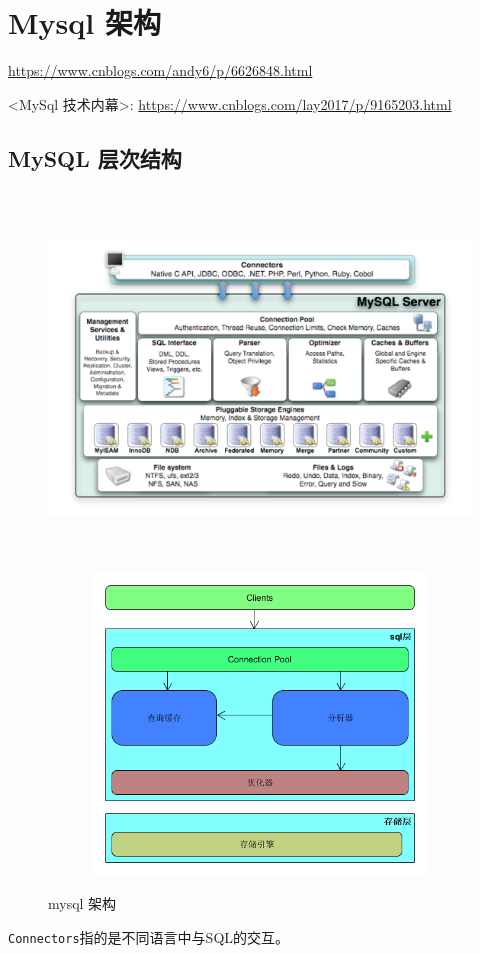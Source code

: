 \documentclass[UTF8,a4paper,12pt]{ctexbook}
\begin{document}
	\newpage	
	\section{Mysql 架构}
		\url{https://www.cnblogs.com/andy6/p/6626848.html}
		
		<MySql 技术内幕>: \url{https://www.cnblogs.com/lay2017/p/9165203.html}
		
		\subsection{MySQL 层次结构}
			\begin{figure}[H]
				\centering
				\includegraphics[width=17cm,height= 10cm]{arch}
				\includegraphics[width=16cm,height= 8cm]{arch2}			
				\caption{mysql 架构}
			\end{figure} 
			
			\verb|Connectors|指的是不同语言中与SQL的交互。
			
\end{document}
